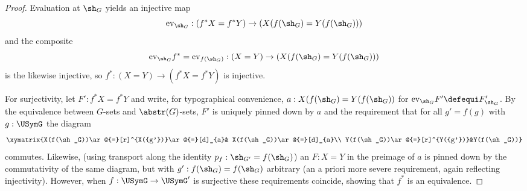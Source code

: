\begin{proof}
  Evaluation at $\sh_G$  yields an injective map
$$\mathrm{ev}_{\sh_G}:(f^*X=f^*Y)\to(X(f(\sh_G)=Y(f(\sh_G)))$$ and the composite
$$\mathrm{ev}_{\sh_G}f^*=\mathrm{ev}_{f(\sh_G)}:(X=Y)\to(X(f(\sh_G)=Y(f(\sh_G)))$$
 is the likewise injective, so $f^*:(X=Y)\to(f^*X=f^*Y)$ is injective.

For surjectivity, let $F':f^*X=f^*Y$ and write, for typographical convenience, $a:X(f(\sh_G)=Y(f(\sh_G))$ for $\mathrm{ev}_{\sh_G}F'\defequi F'_{\sh_G}$.
By the equivalence between $G$-sets and $\abstr(G)$-sets, $F'$ is uniquely pinned down by $a$ and the requirement that for all $g'=f(g)$ with $g:\USymG$ the diagram
$$\xymatrix{X(f(\sh_G))\ar@{=}[r]^{X({g'})}\ar@{=}[d]_{a}&
  X(f(\sh_G))\ar@{=}[d]_{a}\\
  Y(f(\sh_G))\ar@{=}[r]^{Y({g'})}&Y(f(\sh_G))}
$$
commutes.  Likewise, (using transport along the identity $p_f:\sh_{G'}=f(\sh_G)$) an $F:X=Y$ in the preimage of $a$ is pinned down by the commutativity of the same diagram, but with $g':f(\sh_G)=f(\sh_G)$ arbitrary (an a priori more severe requirement, again reflecting injectivity).   However, when $f:\USymG\to\USymG'$ is surjective these requirements coincide, showing that $f^*$ is an equivalence.





\end{proof}

